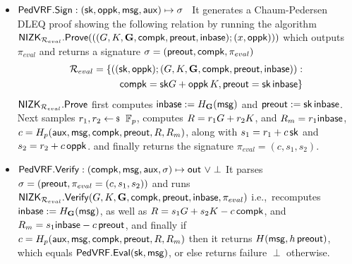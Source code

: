 \begin{itemize}
\item ${\mathsf{PedVRF}}.{\mathsf{Sign}} : (\mathsf{sk},\mathsf{oppk},\mathsf{msg},\mathsf{aux}) \mapsto \sigma$ \,
    It generates a Chaum-Pedersen DLEQ proof  showing the following relation by running the algorithm $ {\mathsf{NIZK}}_{\mathcal{R}_{eval}}.{\mathsf{Prove}}(((G, K,{\mathbf{G}},\mathsf{compk},{\mathsf{preout}},{\mathsf{inbase}}); (x, \mathsf{oppk}))) $ which outputs $ \pi_{eval}$ and returns a signature $ \sigma = ({\mathsf{preout}},\mathsf{compk},\pi_{eval}) $
    \begin{align}
    	\mathcal{R}_{eval}= \{((\mathsf{sk}, \mathsf{oppk}); (G, K,{\mathbf{G}},\mathsf{compk},{\mathsf{preout}},{\mathsf{inbase}})): \nonumber\\
    	\mathsf{compk} = \mathsf{sk}G + \mathsf{oppk}\, K, {\mathsf{preout}} = \mathsf{sk} \,{\mathsf{inbase}} \}  \label{rel:commit} 
    \end{align}
    $ {\mathsf{NIZK}}_{\mathcal{R}_{eval}}.{\mathsf{Prove}} $ first computes ${\mathsf{inbase}} := H_{{\mathbf{G}}}(\mathsf{msg})$ and ${\mathsf{preout}} := \mathsf{sk} \, {\mathsf{inbase}}$.
    Next samples $r_1,r_2 \leftsample \F_p$,
    computes $R = r_1 G + r_2 K$, and $R_m = r_1 {\mathsf{inbase}}$,
     $c = H_p(\mathsf{aux},\mathsf{msg},\mathsf{compk},{\mathsf{preout}},R,R_m)$,
     along with $s_1 = r_1 + c \, \mathsf{sk}$ and $s_2 = r_2 + c \, \mathsf{oppk}$.
    and finally returns the signature $\pi_{eval} = (c,s_1,s_2)$.
\item ${\mathsf{PedVRF}}.{\mathsf{Verify}} : (\mathsf{compk},\mathsf{msg},\mathsf{aux},\sigma) \mapsto {\ensuremath{\mathsf{out}}} \,\, \lor \perp$ It 
    parses $\sigma = ({\mathsf{preout}}, \pi_{eval} =(c,s_1,s_2))$ and runs $ {\mathsf{NIZK}}_{\mathcal{R}_{eval}}.{\mathsf{Verify}}(G, K,{\mathbf{G}},\mathsf{compk},{\mathsf{preout}},{\mathsf{inbase}}, \pi_{eval} ) $ i.e.,\, 
    recomputes ${\mathsf{inbase}} := H_{{\mathbf{G}}}(\mathsf{msg})$, as well as
    $R = s_1 G + s_2 K - c \, \mathsf{compk}$, and
    $R_m = s_1 {\mathsf{inbase}} - c \, {\mathsf{preout}}$, and finally
    if $c = H_p(\mathsf{aux},\mathsf{msg},\mathsf{compk},{\mathsf{preout}},R,R_m)$ then it returns $H(\mathsf{msg}, h \, {\mathsf{preout}})$, which equals ${\mathsf{PedVRF}}.{\mathsf{Eval}}(\mathsf{sk},\mathsf{msg})$,
         or else returns failure $\perp$ otherwise.
\end{itemize}

